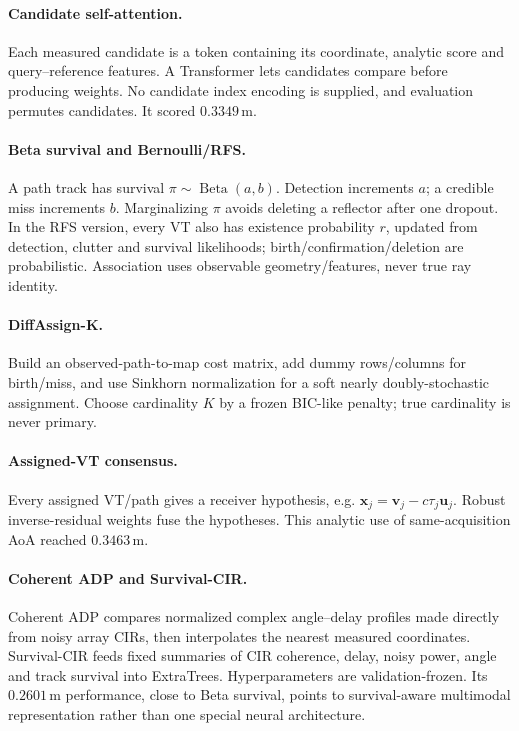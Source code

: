 \documentclass[10pt,a4paper]{article}
\newcommand{\m}{\,\mathrm{m}}
\begin{document}
\paragraph{Candidate self-attention.} Each measured candidate is a token containing its coordinate, analytic score and query--reference features. A Transformer lets candidates compare before producing weights. No candidate index encoding is supplied, and evaluation permutes candidates. It scored $0.3349\m$.

\paragraph{Beta survival and Bernoulli/RFS.} A path track has survival $\pi\sim\operatorname{Beta}(a,b)$. Detection increments $a$; a credible miss increments $b$. Marginalizing $\pi$ avoids deleting a reflector after one dropout. In the RFS version, every VT also has existence probability $r$, updated from detection, clutter and survival likelihoods; birth/confirmation/deletion are probabilistic. Association uses observable geometry/features, never true ray identity.

\paragraph{DiffAssign-K.} Build an observed-path-to-map cost matrix, add dummy rows/columns for birth/miss, and use Sinkhorn normalization for a soft nearly doubly-stochastic assignment. Choose cardinality $K$ by a frozen BIC-like penalty; true cardinality is never primary.

\paragraph{Assigned-VT consensus.} Every assigned VT/path gives a receiver hypothesis, e.g. $\mathbf x_j=\mathbf v_j-c\tau_j\mathbf u_j$. Robust inverse-residual weights fuse the hypotheses. This analytic use of same-acquisition AoA reached $0.3463\m$.

\paragraph{Coherent ADP and Survival-CIR.} Coherent ADP compares normalized complex angle--delay profiles made directly from noisy array CIRs, then interpolates the nearest measured coordinates. Survival-CIR feeds fixed summaries of CIR coherence, delay, noisy power, angle and track survival into ExtraTrees. Hyperparameters are validation-frozen. Its $0.2601\m$ performance, close to Beta survival, points to survival-aware multimodal representation rather than one special neural architecture.
\end{document}
